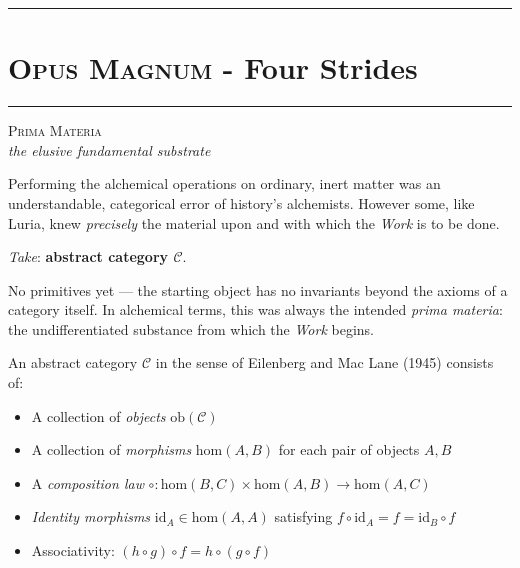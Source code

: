 \documentclass[12pt,a4paper]{article}
\begin{document}
\begin{center}
\rule{0.5\textwidth}{0.4pt}
\end{center}

\newpage

\part{\textsc{Opus Magnum} - Four Strides}

\begin{center}
\rule{0.5\textwidth}{0.4pt}
\end{center}

\bigskip
\begin{center}
\vspace{0.5em}
{\large\textsc{Prima Materia}}
\\[4pt]
{\small\itshape the elusive fundamental substrate}
\vspace{0.4em}
\end{center}

Performing the alchemical operations on ordinary, inert matter was an understandable, categorical error of history's alchemists.  However some, like Luria, knew \emph{precisely} the material upon and with which the \emph{Work} is to be done.

\emph{Take}: \textbf{abstract category \(\mathcal{C}\)}.

No primitives yet --- the starting object has no invariants beyond the axioms of a category itself.  In alchemical terms, this was always the intended \emph{prima materia}: the undifferentiated substance from which the \emph{Work} begins.

An abstract category $\mathcal{C}$ in the sense of Eilenberg and Mac Lane (1945) consists of:
\begin{itemize}
    \item A collection of \emph{objects} $\text{ob}(\mathcal{C})$
    \item A collection of \emph{morphisms} $\text{hom}(A, B)$ for each pair of objects $A, B$
    \item A \emph{composition law} $\circ: \text{hom}(B,C) \times \text{hom}(A,B) \to \text{hom}(A,C)$
    \item \emph{Identity morphisms} $\text{id}_A \in \text{hom}(A,A)$ satisfying $f \circ \text{id}_A = f = \text{id}_B \circ f$
    \item Associativity: $(h \circ g) \circ f = h \circ (g \circ f)$
\end{itemize}
\end{document}

